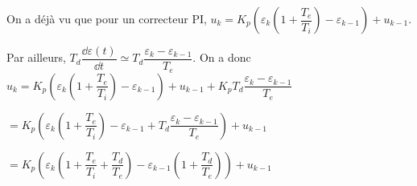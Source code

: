 \begin{demo}
On a déjà vu que pour un correcteur PI, $u_k = K_p\left(\varepsilon_k \left(1+\dfrac{T_e}{T_i}\right) - \varepsilon_{k-1}\right) + u_{k-1} $.

Par ailleurs, $T_d  \dfrac{\dd \varepsilon(t)}{\dd t} \simeq T_d  \dfrac{\varepsilon_k -\varepsilon_{k-1}}{T_e}$. 
On a donc 
 $u_k = K_p\left(\varepsilon_k \left(1+\dfrac{T_e}{T_i}\right) - \varepsilon_{k-1}\right) + u_{k-1}  + K_p  T_d  \dfrac{\varepsilon_k -\varepsilon_{k-1}}{T_e} $
 

$= K_p\left(\varepsilon_k \left(1+\dfrac{T_e}{T_i}\right) - \varepsilon_{k-1} +  T_d  \dfrac{\varepsilon_k -\varepsilon_{k-1}}{T_e}\right) + u_{k-1}   $

$= K_p\left(\varepsilon_k \left(1+\dfrac{T_e}{T_i}+\dfrac{T_d}{T_e}\right) - \varepsilon_{k-1}\left( 1+\dfrac{T_d}{T_e}\right) \right) + u_{k-1}   $

\end{demo}

%
%





